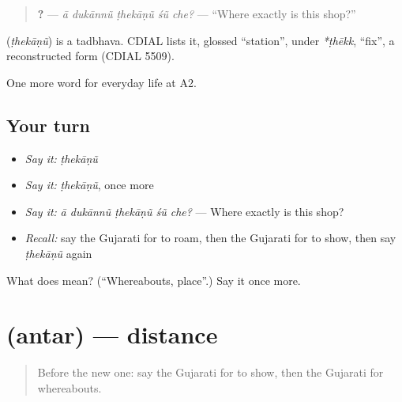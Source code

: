 \begin{quote}
\textbf{    ?} — \emph{ā dukānnũ ṭhekāṇũ śũ che?} — \textquotedblleft{}Where exactly is this shop?\textquotedblright{}
\end{quote}

\begin{cousinweb}
\textbf{} (\emph{ṭhekāṇũ}) is a tadbhava. CDIAL lists it, glossed \textquotedblleft{}station\textquotedblright{}, under \emph{*ṭhēkk}, \textquotedblleft{}fix\textquotedblright{}, a reconstructed form (CDIAL 5509).
\end{cousinweb}

\begin{grammarlens}[title={What you've built}]
One more word for everyday life at A2.
\end{grammarlens}

\subsection*{Your turn}
\begin{itemize}
\raggedright
  \item \emph{Say it:} \emph{ṭhekāṇũ}
  \item \emph{Say it:} \emph{ṭhekāṇũ}, once more
  \item \emph{Say it:} \emph{ā dukānnũ ṭhekāṇũ śũ che?} — Where exactly is this shop?
  \item \emph{Recall:} say the Gujarati for to roam, then the Gujarati for to show, then say \emph{ṭhekāṇũ} again
\end{itemize}

\begin{tcolorbox}[breakable,colback=teal!4,colframe=teal!35!black,title={Before you move on}]
What does  mean? (\textquotedblleft{}Whereabouts, place\textquotedblright{}.) Say it once more.
\end{tcolorbox}
\section[\texorpdfstring{\gu{અંતર} (antar)}{અંતર (antar)}]{ (antar) — distance}

\label{lesson:GU-C195-antar}



\begin{quote}
Before the new one: say the Gujarati for to show, then the Gujarati for whereabouts.
\end{quote}

